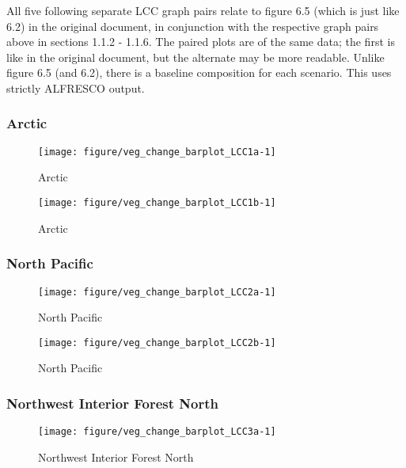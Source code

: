 \documentclass{article}\usepackage[]{graphicx}\usepackage[]{color}
\makeatletter
\def\maxwidth{ %
  \ifdim\Gin@nat@width>\linewidth
    \linewidth
  \else
    \Gin@nat@width
  \fi
}
\makeatother
\begin{document}
All five following separate LCC graph pairs relate to figure 6.5 (which is just like 6.2) in the original document, in conjunction with the respective graph pairs above in sections 1.1.2 - 1.1.6.
The paired plots are of the same data; the first is like in the original document, but the alternate may be more readable.
Unlike figure 6.5 (and 6.2), there is a baseline composition for each scenario.
This uses strictly ALFRESCO output.

\subsubsection{Arctic}
\begin{figure}[H]
\texttt{[image: figure/veg\_change\_barplot\_LCC1a-1]} \caption[Arctic]{Arctic}\label{fig:veg_change_barplot_LCC1a}
\end{figure}


\begin{figure}[H]
\texttt{[image: figure/veg\_change\_barplot\_LCC1b-1]} \caption[Arctic]{Arctic}\label{fig:veg_change_barplot_LCC1b}
\end{figure}



\subsubsection{North Pacific}
\begin{figure}[H]
\texttt{[image: figure/veg\_change\_barplot\_LCC2a-1]} \caption[North Pacific]{North Pacific}\label{fig:veg_change_barplot_LCC2a}
\end{figure}


\begin{figure}[H]
\texttt{[image: figure/veg\_change\_barplot\_LCC2b-1]} \caption[North Pacific]{North Pacific}\label{fig:veg_change_barplot_LCC2b}
\end{figure}



\subsubsection{Northwest Interior Forest North}
\begin{figure}[H]
\texttt{[image: figure/veg\_change\_barplot\_LCC3a-1]} \caption[Northwest Interior Forest North]{Northwest Interior Forest North}\label{fig:veg_change_barplot_LCC3a}
\end{figure}
\end{document}
